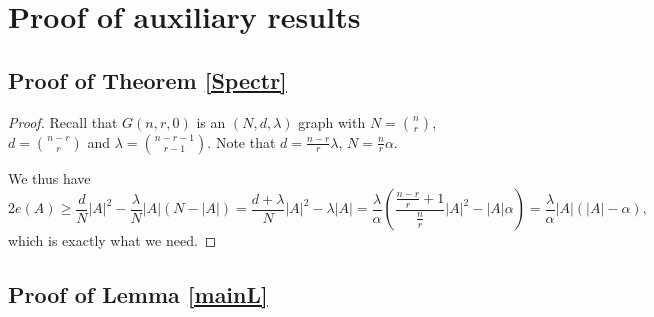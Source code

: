 \documentclass[12pt]{article}
\theoremstyle{remark}
\theoremstyle{definition}
\newcommand{\skob}[1]{\left(#1\right)}
\begin{document}
\section{Proof of auxiliary results}

\subsection{Proof of Theorem \ref{Spectr}}

\begin{proof}
	Recall that $G(n,r,0)$ is an $(N, d, \lambda)$ graph with $N = \binom{n}{r}$, $d = \binom{n-r}{r}$ and $\lambda = \binom{n-r-1}{r-1}$. Note that $d = \frac{n-r}{r}\lambda$, $N = \frac{n}{r}\alpha$.

	We thus have
	$$
		2e(A) \geq \frac{d}{N}|A|^2 - \frac{\lambda}{N}|A|(N-|A|) = \frac{d+\lambda}{N}|A|^2 - \lambda|A| = \frac{\lambda}{\alpha}\skob{\frac{\frac{n-r}{r}+1}{\frac{n}{r}}|A|^2-|A|\alpha} = \frac{\lambda}{\alpha}|A|(|A| - \alpha),
	$$
	which is exactly what we need.
\end{proof}

\subsection{Proof of Lemma \ref{mainL}}
\end{document}
